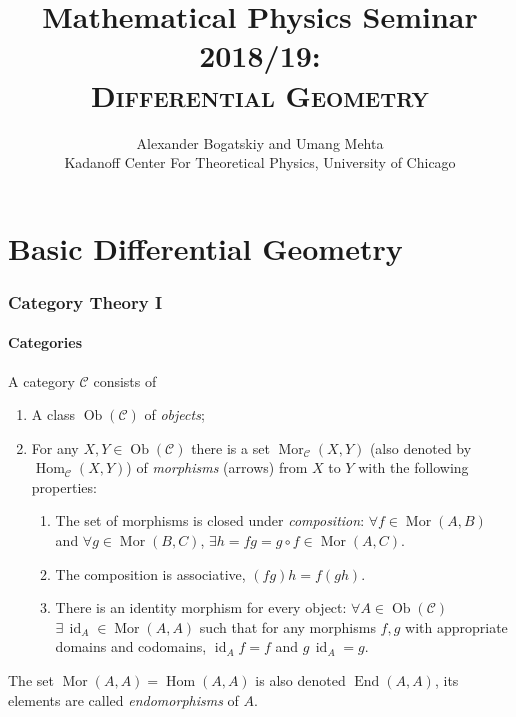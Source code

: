 \documentclass[english,letterpaper]{article}%
\numberwithin{equation}{section}
\numberwithin{figure}{section}
\numberwithin{table}{section}
\theoremstyle{definition}
\theoremstyle{definition}
\theoremstyle{definition}
\theoremstyle{plain}
\theoremstyle{plain}
\theoremstyle{plain}
\theoremstyle{plain}
\theoremstyle{remark}
\theoremstyle{remark}
\DeclareMathOperator{\mor}{Mor}
\DeclareMathOperator{\id}{id}
\DeclareMathOperator{\ob}{Ob}
\DeclareMathOperator{\End}{End}
\DeclareMathOperator{\Hom}{Hom}
\begin{document}
\title{{\Large{}Mathematical Physics Seminar 2018/19:}\\
\textsc{Differential Geometry}}
\author{Alexander Bogatskiy and Umang Mehta\\
{Kadanoff Center For Theoretical Physics, University
of Chicago}}

\maketitle

\tableofcontents{}

\printglossary[type=\acronymtype,title=Abbreviations]

\newpage




\part{Basic Differential Geometry}




\section{Category Theory I}




\subsection{Categories}




\begin{defn}[Categories]
A category \textbf{$\mathcal{C}$} consists of
\begin{enumerate}
\item A class $\ob(\mathcal{C})$ of \emph{objects};
\item For any $X,Y\in\ob(\mathcal{C})$ there is a set $\mor_{\mathcal{C}}(X,Y)$ (also denoted by $\Hom_{\mathcal{C}}(X,Y)$) of \emph{morphisms} (arrows) from $X$ to $Y$ with the following properties:
\begin{enumerate}
\item The set of morphisms is closed under \emph{composition}: $\forall f\in\mor(A,B)$
and $\forall g\in\mor(B,C)$, $\exists h=fg=g\circ f\in\mor(A,C)$.
\item The composition is associative, $\left(fg\right)h=f\left(gh\right)$.
\item There is an identity morphism for every object: $\forall A\in\ob(\mathcal{C})$
$\exists\,\id_{A}\in\mor(A,A)$ such that for any morphisms $f,g$ with
appropriate domains and codomains, $\id_{A}f=f$ and $g\,\id_{A}=g$.
\end{enumerate}
\end{enumerate}
The set $\mor(A,A)=\Hom(A,A)$ is also denoted $\End(A,A)$, its elements are called \emph{endomorphisms} of $A$.
\end{defn}
\end{document}
